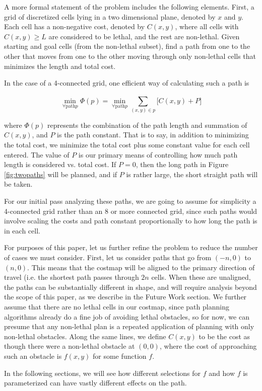 A more formal statement of the problem includes the following elements. First, a grid of discretized cells lying in a two dimensional plane, denoted by $x$ and $y$. Each cell has a non-negative cost, denoted by $C(x,y)$, where all cells with $C(x,y)\ge L$ are considered to be lethal, and the rest are non-lethal.  Given starting and goal cells (from the non-lethal subset), find a path from one to the other that moves from one to the other moving through only non-lethal cells that minimizes the length and total cost. 

In the case of a 4-connected grid, one efficient way of calculating such a path is

\[ \min_{\forall \mathrm{path} p} \Phi(p) = \min_{\forall \mathrm{path} p} \sum\limits_{(x,y) \in p}^{} \Big[ C(x,y) + P \Big] \]

where $\Phi(p)$ represents the combination of the path length and summation of $C(x,y)$, and $P$ is the path constant. That is to say, in addition to minimizing the total cost, we minimize the total cost plus some constant value for each cell entered. The value of $P$ is our primary means of controlling how much path length is considered vs. total cost. If $P=0$, then the long path in Figure \ref{fig:twopaths} will be planned, and if $P$ is rather large, the short straight path will be taken. 


For our initial pass analyzing these paths, we are going to assume for simplicity a 4-connected grid rather than an 8 or more connected grid, since such paths would involve scaling the costs and path constant proportionally to how long the path is in each cell. 

For purposes of this paper, let us further refine the problem to reduce the number of cases we must consider. First, let us consider paths that go from $(-n, 0)$ to $(n, 0)$. This means that the costmap will be aligned to the primary direction of travel (i.e. the shortest path passes through $2n$ cells. When these are unaligned, the paths can be substantially different in shape, and will require analysis beyond the scope of this paper, as we describe in the Future Work section. We further assume that there are no lethal cells in our costmap, since path planning algorithms already do a fine job of avoiding lethal obstacles, so for now, we can presume that any non-lethal plan is a repeated application of planning with only non-lethal obstacles. Along the same lines, we define $C(x,y)$ to be the cost as though there were a non-lethal obstacle at $(0,0)$, where the cost of approaching such an obstacle is $f(x,y)$ for some function $f$. 

In the following sections, we will see how different selections for $f$ and how $f$ is parameterized can have vastly different effects on the path. 
